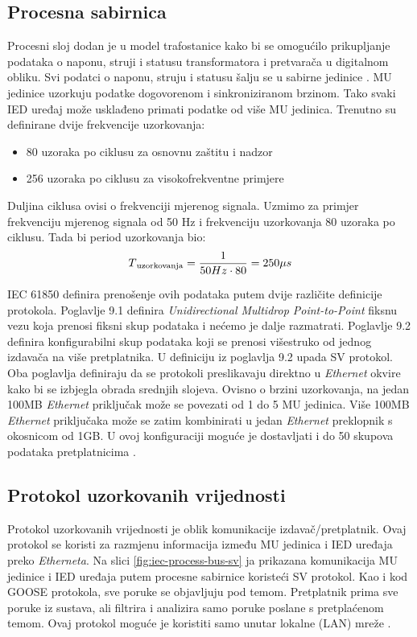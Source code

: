 \documentclass[times, utf8, zavrsni]{fer}
\begin{document}
\subsection{Procesna sabirnica}
Procesni sloj dodan je u model trafostanice kako bi se omogućilo prikupljanje podataka o naponu, struji i statusu transformatora i pretvarača u digitalnom obliku. Svi podatci o naponu, struju i statusu šalju se u sabirne jedinice . MU jedinice uzorkuju podatke dogovorenom i sinkroniziranom brzinom. Tako svaki IED uređaj može usklađeno primati podatke od više MU jedinica. Trenutno su definirane dvije frekvencije uzorkovanja:
\begin{itemize}
    \item 80 uzoraka po ciklusu za osnovnu zaštitu i nadzor
    \item 256 uzoraka po ciklusu za visokofrekventne primjere
\end{itemize}
Duljina ciklusa ovisi o frekvenciji mjerenog signala. Uzmimo za primjer frekvenciju mjerenog signala od 50 Hz i frekvenciju uzorkovanja 80 uzoraka po ciklusu. Tada bi period uzorkovanja bio:
\[
T\textsubscript{uzorkovanja} = \frac{1}{50 Hz \cdot 80} = 250 \mu s
\]

IEC 61850 definira prenošenje ovih podataka putem dvije različite definicije protokola. Poglavlje 9.1 definira \textit{Unidirectional Multidrop Point-to-Point} fiksnu vezu koja prenosi fiksni skup podataka i nećemo je dalje razmatrati. Poglavlje 9.2 definira konfigurabilni skup podataka koji se prenosi višestruko od jednog izdavača na više pretplatnika. U definiciju iz poglavlja 9.2 upada SV protokol. Oba poglavlja definiraju da se protokoli preslikavaju direktno u \textit{Ethernet} okvire kako bi se izbjegla obrada srednjih slojeva. Ovisno o brzini uzorkovanja, na jedan 100MB \textit{Ethernet} priključak može se povezati od 1 do 5 MU jedinica. Više 100MB \textit{Ethernet} priključaka može se zatim kombinirati u jedan \textit{Ethernet} preklopnik s okosnicom od 1GB. U ovoj konfiguraciji moguće je dostavljati i do 50 skupova podataka pretplatnicima \citep{baigent2004iec}.

\subsection{Protokol uzorkovanih vrijednosti}
Protokol uzorkovanih vrijednosti  je oblik komunikacije izdavač/pretplatnik. Ovaj protokol se koristi za razmjenu informacija između MU jedinica i IED uređaja preko \textit{Etherneta}. Na slici \ref{fig:iec-process-bus-sv} ja prikazana komunikacija MU jedinice i IED uređaja putem procesne sabirnice koristeći SV protokol. Kao i kod GOOSE protokola, sve poruke se objavljuju pod temom. Pretplatnik prima sve poruke iz sustava, ali filtrira i analizira samo poruke poslane s pretplaćenom temom. Ovaj protokol moguće je koristiti samo unutar lokalne (LAN) mreže \citep{typhoon:SV}.
\end{document}
